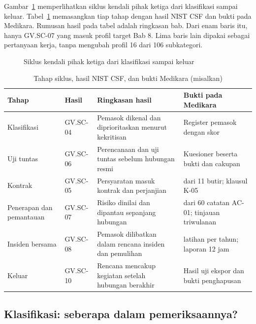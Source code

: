 Gambar~\ref{fig:ch09-siklus} memperlihatkan siklus kendali pihak ketiga dari klasifikasi sampai
keluar. Tabel~\ref{tab:ch09-siklus} memasangkan tiap tahap dengan hasil NIST CSF dan bukti pada
Medikara. Rumusan hasil pada tabel adalah ringkasan bab. Dari enam baris itu, hanya GV.SC-07 yang
masuk profil target Bab 8. Lima baris lain dipakai sebagai pertanyaan kerja, tanpa mengubah profil
16 dari 106 subkategori.

\begin{figure}[!htb]
  \centering
  
  \caption{Siklus kendali pihak ketiga dari klasifikasi sampai keluar}
  \label{fig:ch09-siklus}
\end{figure}

\begin{table}[!htb]
  \centering\small
  \caption{Tahap siklus, hasil NIST CSF, dan bukti Medikara (misalkan)}\label{tab:ch09-siklus}
  \begin{tabularx}{\textwidth}{|>{\raggedright\arraybackslash}p{}|>{\raggedright\arraybackslash}p{}|>{\raggedright\arraybackslash}X|>{\raggedright\arraybackslash}X|}
    \hline
    \textbf{Tahap} & \textbf{Hasil} & \textbf{Ringkasan hasil} & \textbf{Bukti pada Medikara} \\
    \hline
    Klasifikasi & GV.SC-04 & Pemasok dikenal dan diprioritaskan menurut kekritisan & Register
    pemasok dengan skor \\ \hline
    Uji tuntas & GV.SC-06 & Perencanaan dan uji tuntas sebelum hubungan resmi & Kuesioner beserta
    bukti dan cakupan \\ \hline
    Kontrak & GV.SC-05 & Persyaratan masuk kontrak dan perjanjian & 11 dari 11 butir; klausul K-05
    \\ \hline
    Penerapan dan pemantauan & GV.SC-07 & Risiko dinilai dan dipantau sepanjang hubungan & 60 dari
    60 catatan AC-01; tinjauan triwulanan \\ \hline
    Insiden bersama & GV.SC-08 & Pemasok dilibatkan dalam rencana insiden dan pemulihan & 2 latihan
    per tahun; laporan 12 jam \\ \hline
    Keluar & GV.SC-10 & Rencana mencakup kegiatan setelah hubungan berakhir & Hasil uji ekspor dan
    bukti penghapusan \\ \hline
  \end{tabularx}
\end{table}

\subsection*{Klasifikasi: seberapa dalam pemeriksaannya?}

